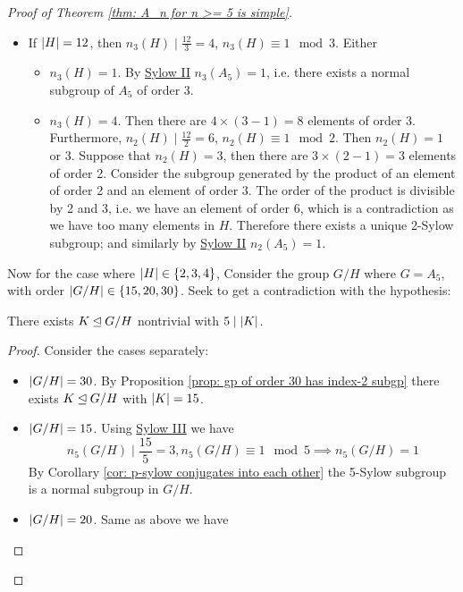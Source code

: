 \begin{proof}[Proof of Theorem \ref{thm: A_n for n >= 5 is simple}]
\begin{itemize}
\begin{enumerate}
            \begin{itemize}
                \item If $\left|H\right| = 12$, then $n_3(H) \mid \frac{12}{3} = 4$, $n_3(H) \equiv 1 \mod{3}$. Either
                \begin{itemize}
                    \item $n_3(H) = 1$. By \hyperref[thm: Sylow II]{Sylow II} $n_3(A_5) = 1$, i.e. there exists a normal subgroup of $A_5$ of order 3.
                    \item $n_3(H) = 4$. Then there are $4 \times (3 - 1) = 8$ elements of order 3. Furthermore, $n_2(H) \mid \frac{12}{2} = 6$, $n_2(H) \equiv 1 \mod{2}$. Then $n_2(H) = 1$ or $3$. Suppose that $n_2(H) = 3$, then there are $3 \times (2 - 1) = 3$ elements of order 2. Consider the subgroup generated by the product of an element of order 2 and an element of order 3. The order of the product is divisible by 2 and 3, i.e. we have an element of order 6, which is a contradiction as we have too many elements in $H$. Therefore there exists a unique 2-Sylow subgroup; and similarly by \hyperref[thm: Sylow II]{Sylow II} $n_2(A_5) = 1$.
                \end{itemize}
            \end{itemize}
            Now for the case where $\left|H\right| \in \{2, 3, 4\}$, Consider the group $G/H$ where $G = A_5$, with order $\left|G/H\right| \in \{15, 20, 30\}$. Seek to get a contradiction with the hypothesis:
            \begin{claim}
                There exists $K \unlhd G/H$ nontrivial with $5 \mid \left|K\right|$.
            \end{claim}
            \begin{proof}
                Consider the cases separately:
                \begin{itemize}
                    \item $\left|G/H\right| = 30$. By Proposition \ref{prop: gp of order 30 has index-2 subgp} there exists $K \unlhd G/H$ with $\left|K\right| = 15$.
                    \item $\left|G/H\right| = 15$. Using \hyperref[thm: Sylow III]{Sylow III} we have
                    \[
                        n_5(G/H)\mid \frac{15}{5} = 3, n_5(G/H) \equiv 1 \mod{5} \implies n_5(G/H) = 1
                    \]
                    By Corollary \ref{cor: p-sylow conjugates into each other} the 5-Sylow subgroup is a normal subgroup in $G/H$.
                    \item $\left|G/H\right| = 20$. Same as above we have

\end{itemize}
\end{proof}
\end{enumerate}
\end{itemize}
\end{proof}
